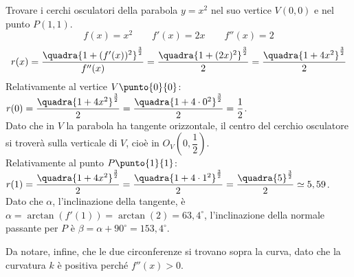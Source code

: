 \begin{esempio}
 Trovare i cerchi osculatori della parabola \(y=x^2\) nel suo vertice 
\(V(0, 0)\) e nel punto \(P(1, 1)\).
\[f(x)=x^2\qquad f'(x)= 2x \qquad f''(x)=2\]
\[r(x) = \dfrac{\quadra{1 +(f'(x))^2}^{\frac{3}{2}}}{f''(x)} = 
         \dfrac{\quadra{1 +(2x)^2}^{\frac{3}{2}}}{2} = 
         \dfrac{\quadra{1 +4x^2}^{\frac{3}{2}}}{2}\]
Relativamente al vertice \(V \punto{0}{0}\): \quad
\(r(0) = \dfrac{\quadra{1 +4x^2}^{\frac{3}{2}}}{2} =
         \dfrac{\quadra{1 +4 \cdot 0^2}^{\frac{3}{2}}}{2} =\dfrac{1}{2}\).\\
Dato che in \(V\) la parabola ha tangente orizzontale, il centro del cerchio 
osculatore si troverà sulla verticale di \(V\), cioè in \(O_V(0, 
\dfrac{1}{2})\).\\
Relativamente al punto \(P \punto{1}{1}\): \quad
\(r(1) = \dfrac{\quadra{1 +4x^2}^{\frac{3}{2}}}{2} =
         \dfrac{\quadra{1 +4 \cdot 1^2}^{\frac{3}{2}}}{2} =
         \dfrac{\quadra{5}^{\frac{3}{2}}}{2} \simeq 5,59\).\\

Dato che \(\alpha\), l'inclinazione della tangente, è 
\(\alpha=\arctan(f'(1))=\arctan(2)=63,4^\circ\), l'inclinazione della normale 
passante per \(P\) è \(\beta=\alpha+90^\circ=153,4^\circ\).

Da notare, infine, che le due circonferenze si trovano sopra la curva, dato che 
la curvatura \(k\) è positiva perché \(f''(x) > 0\).
\end{esempio}

